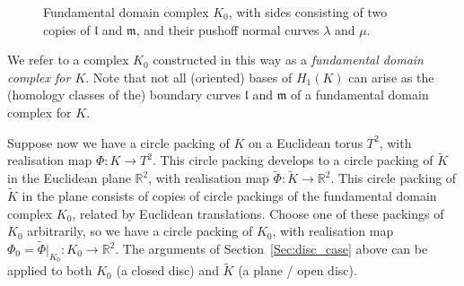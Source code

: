 \documentclass[12pt]{amsart}
\numberwithin{equation}{section}
\theoremstyle{named}
\newcommand{\refsec}[1]{Section~\ref{Sec:#1}}
\newcommand{\R}{\mathbb{R}}
\newcommand{\To}{\longrightarrow}
\begin{document}
\begin{figure}
\begin{center}
\end{center}
 \caption{ Fundamental domain complex $K_0$, with sides consisting of two
		 copies of $\mathfrak{l}$ and $\mathfrak{m}$, and their pushoff normal curves $\lambda$ and $\mu$.}
 \label{Fig:fundamental_domain_complex}
\end{figure}

We refer to a complex $K_0$ constructed in this way as a \emph{fundamental domain complex for $K$}. Note that not all (oriented) bases of $H_1 (K)$ can arise as the (homology classes of the) boundary curves $\mathfrak{l}$ and $\mathfrak{m}$ of a fundamental domain complex for $K$.

Suppose now we have a circle packing of $K$ on a Euclidean torus $T^2$, with realisation map $\Phi \colon K \To T^2$. This circle packing develops to a circle packing of $\widetilde{K}$ in the Euclidean plane $\R^2$, with realisation map $\widetilde{\Phi} \colon \widetilde{K} \To \R^2$. This circle packing of $\widetilde{K}$ in the plane consists of copies of circle packings of the fundamental domain complex $K_0$, related by Euclidean translations. Choose one of these packings of $K_0$ arbitrarily, so we have a circle packing of $K_0$, with realisation map $\Phi_0 = \widetilde{\Phi}|_{K_0} \colon K_0 \To \R^2$. The arguments of \refsec{disc_case} above can be applied to both $K_0$ (a closed disc) and $\widetilde{K}$ (a plane / open disc). 
\end{document}
